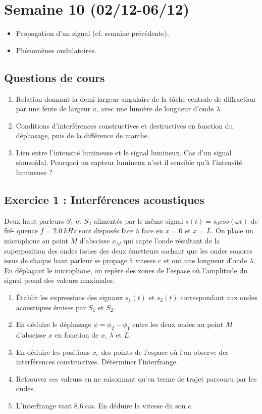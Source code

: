 \section{Semaine 10 (02/12-06/12) }


\begin{itemize}
	\item Propagation d'un signal (cf. semaine précédente).
	\item Phénomènes ondulatoires.
\end{itemize}

\subsection{Questions de cours}

\begin{enumerate}
	\item Relation donnant la demi-largeur angulaire de la tâche centrale de diffraction par une fente de largeur $a$, avec une lumière de longueur d’onde $\lambda$.
	\item Conditions d'interférences constructives et destructives en fonction du déphasage, puis de la différence de marche.
	\item Lien entre l'intensité lumineuse et le signal lumineux. Cas d'un signal sinusoïdal. Pourquoi un capteur lumineux n'est il sensible qu'à l'intensité lumineuse ?
\end{enumerate}

\subsection{Exercice 1 : Interférences acoustiques}

Deux haut-parleurs $S_1$ et $S_2$ alimentés par le même signal $s(t) = s_0 cos (\omega t)$ de fré-
quence $f = \SI{2,0}{kHz}$ sont disposés face à face en $x = 0$ et $x = L$. On place un microphone au point $M$ d’abscisse $x_M$ qui capte l’onde résultant de la superposition des ondes issues des deux émetteurs sachant que les ondes sonores issus de chaque haut parleur se propage à vitesse c et ont une longueur d’onde $\lambda$. En déplaçant le microphone, on repère des zones de l’espace où l’amplitude du signal prend des valeurs maximales.

\begin{enumerate}
	\item Établir les expressions des signaux $s_1(t)$ et $s_2(t)$ correspondant aux ondes acoustiques émises par $S_1$ et $S_2$.
	\item En déduire le déphasage $\phi = \phi_2-\phi_1$ entre les deux ondes au point $M$ d'abscisse $x$ en fonction de $x$, $\lambda$ et $L$.
	\item En déduire les positions $x_c$ des points de l'espace où l'on observe des interférences constructives. Déterminer l'interfrange.
	\item Retrouver ces valeurs en ne raisonnant qu'en terme de trajet parcouru par les ondes.
	\item L'interfrange vaut $\SI{8,6}{cm}$. En déduire la vitesse du son $c$.
\end{enumerate}

